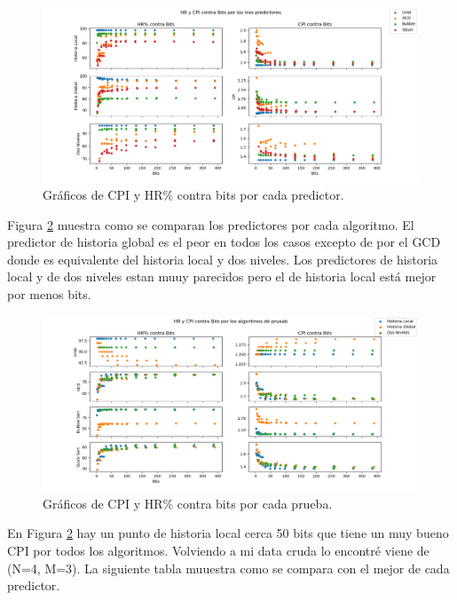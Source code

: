 \documentclass[a4paper]{article}
\begin{document}
\begin{figure}[!htb]
\centering
\includegraphics[scale=0.4]{./img/predictor_superplot}
\caption{Gráficos de CPI y HR\% contra bits por cada predictor.}
\label{fig:predictor_superplot}
\end{figure}

Figura \ref{fig:algos_superplot} muestra como se comparan los predictores por cada algoritmo. El predictor de historia global es el peor en todos los casos excepto de por el GCD donde es equivalente del historia local y dos niveles. Los predictores de historia local y de dos niveles estan muuy parecidos pero el de historia local está mejor por menos bits.

\begin{figure}[!htb]
\centering
\includegraphics[scale=0.4]{./img/algos_superplot}
\caption{Gráficos de CPI y HR\% contra bits por cada prueba.}
\label{fig:algos_superplot}
\end{figure}

En Figura \ref{fig:algos_superplot} hay un punto de historia local cerca 50 bits que tiene un muy bueno CPI por todos los algoritmos. Volviendo a mi data cruda lo encontré viene de (N=4, M=3). La siguiente tabla muuestra como se compara con el mejor de cada predictor.
\end{document}

